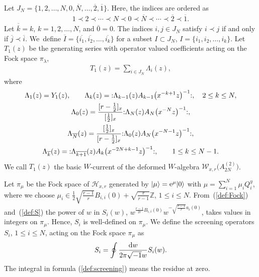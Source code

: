 \documentclass[10pt,a4paper]{amsart}
\numberwithin{equation}{section}
\begin{document}
Let $J_N=\{1,2,\dots,N,0,\overline{N},\dots,\overline{2},\overline{1}\}$.
Here, the indices are ordered as
\begin{gather*}
1 \prec 2 \prec \cdots \prec N \prec 0
\prec \overline{N} \prec \cdots \prec \overline{2} \prec \overline{1}.
\end{gather*}
Let $\overline{\overline{k}}=k$, $k=1,2,\dots, N$, and $\overline{0}=0$.
The indices $i, j \in J_N$ satisfy $i \prec j$ if and only if $\overline{j} \prec \overline{i}$.
We~define $\overline{I}=\{\overline{i_1}, \overline{i_2}, \dots, \overline{i_k}\}$ for a subset
$I \subset J_N$, $I=\{i_1, i_2, \dots, i_k\}$.
Let $T_1(z)$ be the generating series with operator valued coefficients acting on
the Fock space $\pi_\lambda$,
\begin{gather*}
T_1(z)=\sum_{i \in J_N}\Lambda_i(z),
\end{gather*}
where
\begin{gather}
\Lambda_1(z)=Y_1(z),\qquad
{\Lambda}_k(z)={:}\Lambda_{k-1}(z)A_{k-1}\big(x^{-k+1}z\big)^{-1}{:},\quad
2 \leq k \leq N,\notag
\\
\Lambda_0(z)=\frac{[r-\frac{1}{2}]_x}{[\frac{1}{2}]_x}{:}\Lambda_N(z)A_N\big(x^{-N}z\big)^{-1}{:},\notag
\\
\Lambda_{\overline{N}}(z)=\frac{[\frac{1}{2}]_x}{[r-\frac{1}{2}]_x}
{:}\Lambda_0(z)A_N\big(x^{-N-1}z\big)^{-1}{:},\notag
\\
\Lambda_{\overline{k}}(z)={:}\Lambda_{\overline{k+1}}(z)A_k\big(x^{-2N+k-1}z\big)^{-1}{:},\qquad
1\leq k \leq N-1.
\label{def:Lambda}
\end{gather}
We call $T_1(z)$ the basic $W$-current of the deformed $W$-algebra
${\mathcal W}_{x,r}\big(A_{2N}^{(2)}\big)$.

Let $\pi_\mu$ be the Fock space of ${\mathcal H}_{x,r}$ generated by $|\mu \rangle={\rm e}^\mu|0\rangle$ with
$\mu=\sum_{i=1}^N \mu_i Q_i^y$, where we choose
$\mu_i \in\frac{1}{2}\sqrt{\frac{r-1}{r}}B_{i,i}(0)+\sqrt{\frac{r}{r-1}}\mathbb{Z}$, $1\leq i \leq N$.
From~(\ref{def:Fock}) and~(\ref{def:S}) the power of $w$ in $S_i(w)$, $w^{\frac{r-1}{2r}B_{i,i}(0)}w^{-\sqrt{\frac{r-1}{r}}a_i(0)}$, takes values in integers on $\pi_\mu$.
Hence, $S_i$ is well-defined on $\pi_\mu$.
We define the screening operators $S_i$, $1\leq i \leq N$, acting on the Fock space $\pi_\mu$ as
\begin{gather}
S_i=\oint \frac{{\rm d}w}{{2\pi \sqrt{-1}w}} S_i(w).
\label{def:screening}
\end{gather}
The integral in formula (\ref{def:screening}) means the residue at zero.
\end{document}

